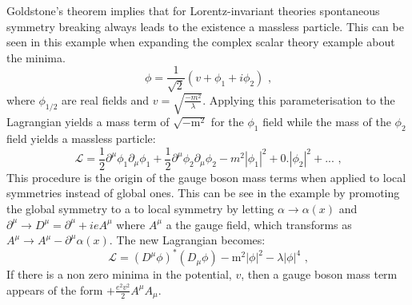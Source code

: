 Goldstone's theorem \cite{Goldstone:1962es} implies that for Lorentz-invariant theories spontaneous symmetry breaking always leads to the existence a massless particle.  This can be seen in this example when expanding the complex scalar theory example about the minima.
%
\begin{equation}
\phi = \frac{1}{\sqrt{2}}(v + \phi_{1} + i \phi_{2}) \text{ ,}
\end{equation}
%
\noindent where $\phi_{1/2}$ are real fields and $v = \sqrt{\frac{-m^{2}}{\lambda}}$.  Applying this parameterisation to the Lagrangian yields a mass term of $\sqrt{-\text{m}^{2}}$ for the $\phi_{1}$ field while the mass of the $\phi_{2}$ field yields a massless particle:
%
\begin{equation}
\mathcal{L} = \frac{1}{2}\partial^{\mu} \phi_{1} \partial_{\mu} \phi_{1} + \frac{1}{2}\partial^{\mu} \phi_{2} \partial_{\mu} \phi_{2} - m^{2}|\phi_{1}|^{2} + 0.|\phi_{2}|^{2} + ... \text{ ,}
\end{equation}
%
\noindent This procedure is the origin of the gauge boson mass terms when applied to local symmetries instead of global ones.  This can be see in the example by promoting the global symmetry to a to local symmetry by letting $\alpha \rightarrow \alpha(x)$ and $\partial^{\mu} \rightarrow D^{\mu} = \partial^{\mu} + ieA^{\mu}$ where $A^{\mu}$ a the gauge field, which transforms as $A^{\mu} \rightarrow A^{\mu} - \partial^{\mu}\alpha(x)$.  The new Lagrangian becomes:
%
\begin{equation}
\mathcal{L} = (D^{\mu} \phi)^{*} (D_{\mu} \phi) - \text{m}^{2} |\phi|^{2} - \lambda |\phi|^{4} \text{ ,}
\end{equation}
%
\noindent If there is a non zero minima in the potential, $v$, then a gauge boson mass term appears of the form $+\frac{e^{2}v^{2}}{2} A^{\mu} A_{\mu}$.


